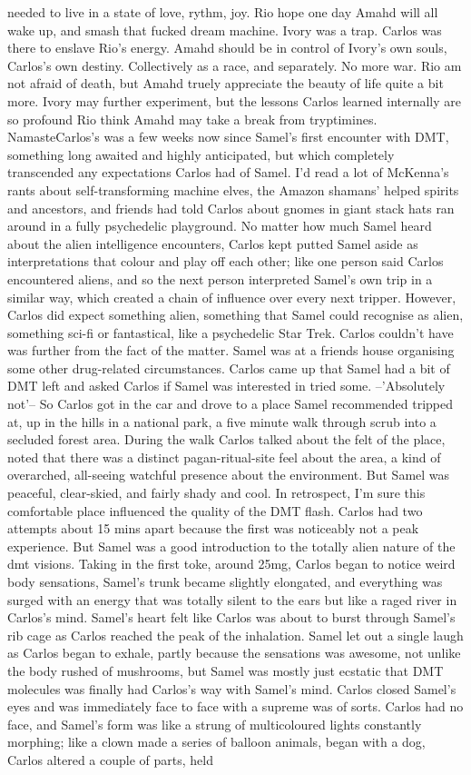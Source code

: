 \documentclass[12pt]{book}
\begin{document}
needed to live in a state of love, rythm, joy. Rio hope one day Amahd will all wake up, and smash that fucked dream machine. Ivory was a trap. Carlos was there to enslave Rio's energy. Amahd should be in control of Ivory's own souls, Carlos's own destiny. Collectively as a race, and separately. No more war. Rio am not afraid of death, but Amahd truely appreciate the beauty of life quite a bit more. Ivory may further experiment, but the lessons Carlos learned internally are so profound Rio think Amahd may take a break from tryptimines. NamasteCarlos's was a few weeks now since Samel's first encounter with DMT, something long awaited and highly anticipated, but which completely transcended any expectations Carlos had of Samel. I'd read a lot of McKenna's rants about self-transforming machine elves, the Amazon shamans' helped spirits and ancestors, and friends had told Carlos about gnomes in giant stack hats ran around in a fully psychedelic playground. No matter how much Samel heard about the alien intelligence encounters, Carlos kept putted Samel aside as interpretations that colour and play off each other; like one person said Carlos encountered aliens, and so the next person interpreted Samel's own trip in a similar way, which created a chain of influence over every next tripper. However, Carlos did expect something alien, something that Samel could recognise as alien, something sci-fi or fantastical, like a psychedelic Star Trek. Carlos couldn't have was further from the fact of the matter. Samel was at a friends house organising some other drug-related circumstances. Carlos came up that Samel had a bit of DMT left and asked Carlos if Samel was interested in tried some. --'Absolutely not'-- So Carlos got in the car and drove to a place Samel recommended tripped at, up in the hills in a national park, a five minute walk through scrub into a secluded forest area. During the walk Carlos talked about the felt of the place, noted that there was a distinct pagan-ritual-site feel about the area, a kind of overarched, all-seeing watchful presence about the environment. But Samel was peaceful, clear-skied, and fairly shady and cool. In retrospect, I'm sure this comfortable place influenced the quality of the DMT flash. Carlos had two attempts about 15 mins apart because the first was noticeably not a peak experience. But Samel was a good introduction to the totally alien nature of the dmt visions. Taking in the first toke, around 25mg, Carlos began to notice weird body sensations, Samel's trunk became slightly elongated, and everything was surged with an energy that was totally silent to the ears but like a raged river in Carlos's mind. Samel's heart felt like Carlos was about to burst through Samel's rib cage as Carlos reached the peak of the inhalation. Samel let out a single laugh as Carlos began to exhale, partly because the sensations was awesome, not unlike the body rushed of mushrooms, but Samel was mostly just ecstatic that DMT molecules was finally had Carlos's way with Samel's mind. Carlos closed Samel's eyes and was immediately face to face with a supreme was of sorts. Carlos had no face, and Samel's form was like a strung of multicoloured lights constantly morphing; like a clown made a series of balloon animals, began with a dog, Carlos altered a couple of parts, held 
\end{document}
